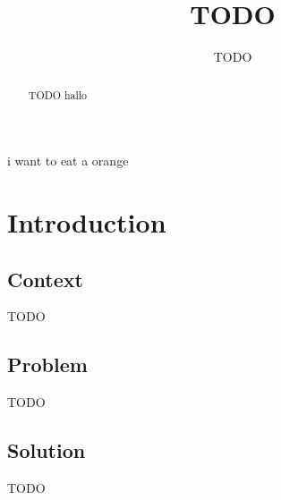 \documentclass{IEEEtran}
\title{TODO}
\author{TODO}
\begin{document}
    \maketitle
 
    i want to eat a orange 

    \begin{abstract}
        TODO
        hallo
    \end{abstract}
    
    \section{Introduction}
    \label{sec:introduction}

    \subsection*{Context}
    TODO~\cite{Hackenberg2014}~\cite{Legat2014}~\cite{Teufl2015}


    \subsection*{Problem}
    TODO 

    \subsection*{Solution}
    TODO 
\end{document}
